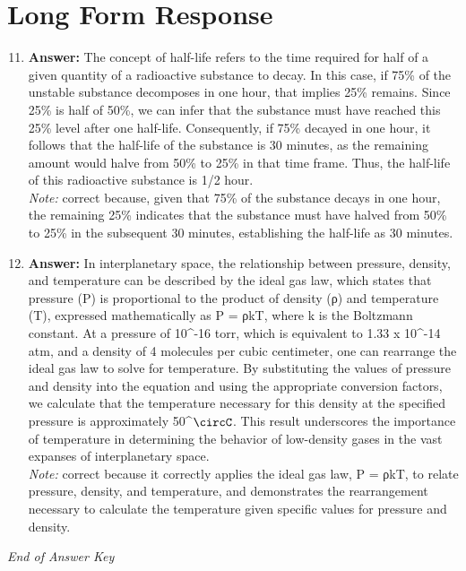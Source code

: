 \documentclass[12pt]{article}
\begin{document}
\section*{Long Form Response}
\begin{enumerate}[label=\arabic*.]
\setcounter{enumi}{10}
\item \textbf{Answer:} The concept of half-life refers to the time required for half of a given quantity of a radioactive substance to decay. In this case, if 75\% of the unstable substance decomposes in one hour, that implies 25\% remains. Since 25\% is half of 50\%, we can infer that the substance must have reached this 25\% level after one half-life. Consequently, if 75\% decayed in one hour, it follows that the half-life of the substance is 30 minutes, as the remaining amount would halve from 50\% to 25\% in that time frame. Thus, the half-life of this radioactive substance is 1/2 hour.
\\ \textit{Note:} correct because, given that 75\% of the substance decays in one hour, the remaining 25\% indicates that the substance must have halved from 50\% to 25\% in the subsequent 30 minutes, establishing the half-life as 30 minutes.
\item \textbf{Answer:} In interplanetary space, the relationship between pressure, density, and temperature can be described by the ideal gas law, which states that pressure (P) is proportional to the product of density (ρ) and temperature (T), expressed mathematically as P = ρkT, where k is the Boltzmann constant. At a pressure of 10^-16 torr, which is equivalent to 1.33 x 10^-14 atm, and a density of 4 molecules per cubic centimeter, one can rearrange the ideal gas law to solve for temperature. By substituting the values of pressure and density into the equation and using the appropriate conversion factors, we calculate that the temperature necessary for this density at the specified pressure is approximately 50^\ensuremath{\circC}. This result underscores the importance of temperature in determining the behavior of low-density gases in the vast expanses of interplanetary space.
\\ \textit{Note:} correct because it correctly applies the ideal gas law, P = ρkT, to relate pressure, density, and temperature, and demonstrates the rearrangement necessary to calculate the temperature given specific values for pressure and density.
\end{enumerate}

\vfill
\noindent\textit{End of Answer Key}
\end{document}
